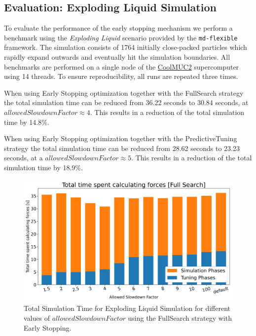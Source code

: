 \documentclass[conference]{IEEEtran}
\begin{document}
\subsection{Evaluation: Exploding Liquid Simulation}
\label{sec:evaluation}

To evaluate the performance of the early stopping mechanism we perform a benchmark using the \textit{Exploding Liquid} scenario provided by the \texttt{md-flexible} framework. The simulation consists of 1764 initially close-packed particles which rapidly expand outwards and eventually hit the simulation boundaries. All benchmarks are performed on a single node of the \href{https://doku.lrz.de/coolmuc-2-11484376.html}{CoolMUC2} supercomputer using 14 threads. To ensure reproducibility, all runs are repeated three times.

\begin{description}[style=nextline]
    \item[FullSearch (\autoref{fig:full_search})]
        When using Early Stopping optimization together with the FullSearch strategy the total simulation time
        can be reduced from 36.22 seconds to 30.84 seconds, at $allowedSlowdownFactor \approx4$. This results in a reduction of the total simulation time by 14.8\%.
    \item[PredictiveTuning (\autoref{fig:predictive_tuning})]
        When using Early Stopping optimization together with the PredictiveTuning strategy the total simulation time can be reduced from 28.62 seconds to 23.23 seconds, at a $allowedSlowdownFactor \approx5$. This results in a reduction of the total simulation time by 18.9\%.
\end{description}

\begin{figure}[H]
    \centering

    \includegraphics[width=\columnwidth]{../data/explodingLiquid/cluster/fullSearch/analytics/total_time_average.png}

    \caption{Total Simulation Time for Exploding Liquid Simulation for different values of $allowedSlowdownFactor$ using the FullSearch strategy with Early Stopping.}
    \label{fig:full_search}
\end{figure}
\end{document}
